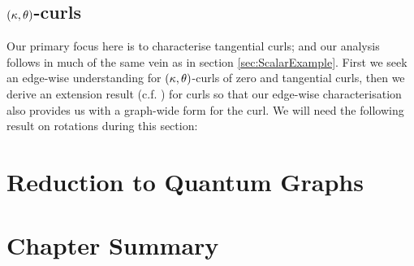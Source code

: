 \subsection{$\left( \kappa,\theta \right)$-curls} \label{sec:ktCurls}
Our primary focus here is to characterise tangential curls; and our analysis follows in much of the same vein as in section \ref{sec:ScalarExample}.
First we seek an edge-wise understanding for $\left( \kappa,\theta \right)$-curls of zero and tangential curls, then we derive an extension result (c.f. ) for curls so that our edge-wise characterisation also provides us with a graph-wide form for the curl.
We will need the following result on rotations during this section:

\section{Reduction to Quantum Graphs} \label{sec:CurlReductionToQG}

\section{Chapter Summary} \label{sec:CurlSummary}


